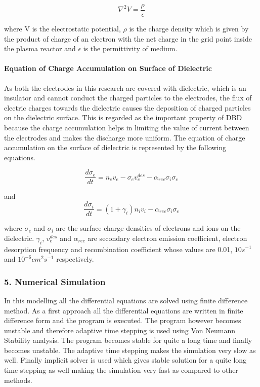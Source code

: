 \documentclass[11pt]{article}
\begin{document}
\begin{equation}
\nabla ^2 V=\frac{\rho}{\epsilon}
\end{equation}

where V is the electrostatic potential, \(\rho\) is the charge density
which is given by the product of charge of an electron with the net
charge in the grid point inside the plasma reactor and \(\epsilon\) is
the permittivity of medium.

\paragraph{Equation of Charge Accumulation on Surface of
Dielectric}\label{equation-of-charge-accumulation-on-surface-of-dielectric}

As both the electrodes in this research are covered with dielectric,
which is an insulator and cannot conduct the charged particles to the
electrodes, the flux of electric charges towards the dielectric causes
the deposition of charged particles on the dielectric surface. This is
regarded as the important property of DBD because the charge
accumulation helps in limiting the value of current between the
electrodes and makes the discharge more uniform. The equation of charge
accumulation on the surface of dielectric is represented by the
following equations.

\[\frac{d \sigma_e}{dt}=n_e v_e-\sigma_ev{_e^{des}}-\alpha_{rec}\sigma_i\sigma_e\]

and
\[\frac{d \sigma_i}{dt}=(1+\gamma_i)n_iv_i-\alpha_{rec}\sigma_i\sigma_e\]

where \(\sigma_e\) and \(\sigma_i\) are the surface charge densities of
electrons and ions on the dielectric. \(\gamma_i\), \(v_e^{des}\) and
\(\alpha_{rec}\) are secondary electron emission coefficient, electron
desorption frequency and recombination coefficient whose values are
0.01, \(10s^{-1}\) and \(10^{-6} cm^2s^{-1}\) respectively.

    \subsubsection{5. Numerical Simulation}\label{numerical-simulation}

In this modelling all the differential equations are solved using finite
difference method. As a first approach all the differential equations
are written in finite difference form and the program is executed. The
program however becomes unstable and therefore adaptive time stepping is
used using Von Neumann Stability analysis. The program becomes stable
for quite a long time and finally becomes unstable. The adaptive time
stepping makes the simulation very slow as well. Finally implicit solver
is used which gives stable solution for a quite long time stepping as
well making the simulation very fast as compared to other methods.
\end{document}
